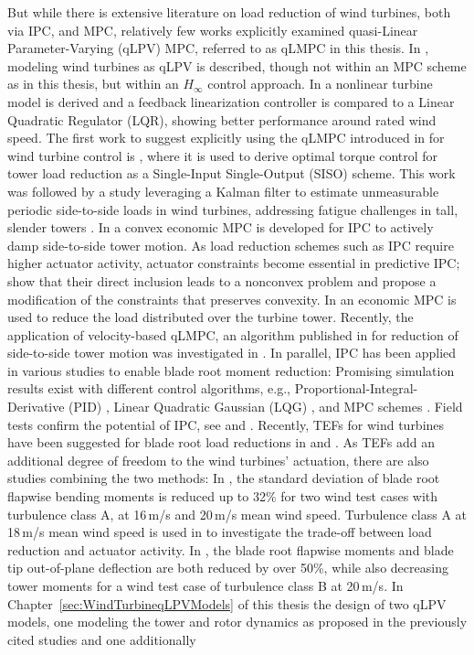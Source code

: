 But while there is extensive literature on load reduction of wind turbines, both via IPC, and MPC, relatively few works explicitly examined quasi-Linear Parameter-Varying (qLPV) MPC, referred to as qLMPC in this thesis. In \cite{Bianchi2007}, modeling wind turbines as qLPV is described, though not within an MPC scheme as in this thesis, but within an $H_{\infty}$ control approach. In \cite{kumar2010FeedbackLinLQR} a nonlinear turbine model is derived and a feedback linearization controller is compared to a Linear Quadratic Regulator (LQR), showing better performance around rated wind speed. The first work to suggest explicitly using the qLMPC introduced in \cite{cisneros2016efficient} for wind turbine control is \cite{mulders2020preventing}, where it is used to derive optimal torque control for tower load reduction as a Single-Input Single-Output (SISO) scheme. This work was followed by a study leveraging a Kalman filter to estimate unmeasurable periodic side-to-side loads in wind turbines, addressing fatigue challenges in tall, slender towers \cite{pamososuryo2022loadestimation}. In \cite{pamososuryo2022individual,pamososuryo2023convex} a convex economic MPC is developed for IPC to actively damp side-to-side tower motion. As load reduction schemes such as IPC require higher actuator activity, actuator constraints become essential in predictive IPC; \cite{petrovic2021mpc} show that their direct inclusion leads to a nonconvex problem and propose a modification of the constraints that preserves convexity. In \cite{feng2022economic} an economic MPC is used to reduce the load distributed over the turbine tower. Recently, the application of velocity-based qLMPC, an algorithm published in \cite{cisneros2020velocity} for reduction of side-to-side tower motion was investigated in \cite{fonseca2024windTurbineSideSide}. In parallel, IPC has been applied in various studies to enable blade root moment reduction: Promising simulation results exist with different control algorithms, e.g., Proportional-Integral-Derivative (PID) \cite{hoffmann2018load}, Linear Quadratic Gaussian (LQG) \cite{selvam2009feedback}, and MPC schemes \cite{petrovic2021mpc}. Field tests confirm the potential of IPC, see \cite{ossmann2021field} and \cite{bossanyi2012advanced}. Recently, TEFs for wind turbines have been suggested for blade root load reductions in \cite{zhang2015parameter} and \cite{bergami2017highfidelity}. As TEFs add an additional degree of freedom to the wind turbines' actuation, there are also studies combining the two methods: In \cite{wilson2009combined}, the standard deviation of blade root flapwise bending moments is reduced up to 32\% for two wind test cases with turbulence class A, at 16\,m/s and 20\,m/s mean wind speed. Turbulence class A at 18\,m/s mean wind speed is used in \cite{henriksen2013model} to investigate the trade-off between load reduction and actuator activity. In \cite{he2018combined}, the blade root flapwise moments and blade tip out-of-plane deflection are both reduced by over 50\%, while also decreasing tower moments for a wind test case of turbulence class B at 20\,m/s. In Chapter~\ref{sec:WindTurbineqLPVModels} of this thesis the design of two qLPV models, one modeling the tower and rotor dynamics as proposed in the previously cited studies and one additionally 